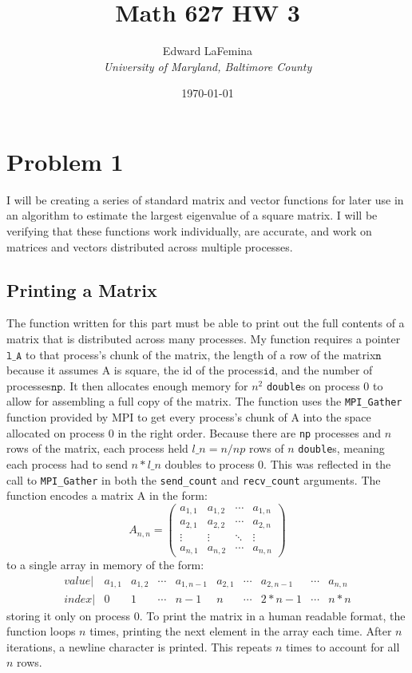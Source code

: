 \documentclass[11pt]{article}
\author{Edward LaFemina \\
		\it{University of Maryland, Baltimore County}}
\title{Math 627 HW 3}
\date{\today}
\begin{document}
\maketitle
\tableofcontents

\pagebreak
\section{Problem 1}
I will be creating a series of standard matrix and vector functions for later use in an algorithm to estimate the largest eigenvalue of a square matrix. I will be verifying that these functions work individually, are accurate, and work on matrices and vectors distributed across multiple processes.

\subsection{Printing a Matrix}
The function written for this part must be able to print out the full contents of a matrix that is distributed across many processes. My function requires a pointer\(\texttt{l\_A}\) to that process's chunk of the matrix, the length of a row of the matrix\(\texttt{n}\) because it assumes A is square, the id of the process\(\texttt{id}\), and the number of processes\(\texttt{np}\). It then allocates enough memory for $ n^2 $ \texttt{double}s on process $ 0 $ to allow for assembling a full copy of the matrix. The function uses the \texttt{MPI\_Gather} function provided by MPI to get every process's chunk of A into the space allocated on process 0 in the right order. Because there are \texttt{np} processes and $ n $ rows of the matrix, each process held $ l\_n = n / np $ rows of $ n $ \texttt{double}s, meaning each process had to send $ n*l\_n $ doubles to process $ 0 $. This was reflected in the call to \texttt{MPI\_Gather} in both the \texttt{send\_count} and \texttt{recv\_count} arguments. The function encodes a matrix A in the form:
$$
A_{n,n} =
\begin{pmatrix}
	a_{1,1} & a_{1,2} & \cdots & a_{1,n} \\
	a_{2,1} & a_{2,2} & \cdots & a_{2,n} \\
	\vdots  & \vdots  & \ddots & \vdots  \\
	a_{n,1} & a_{n,2} & \cdots & a_{n,n} 
\end{pmatrix}
$$
 to a single array in memory of the form:
$$
\begin{matrix} 
value |& a_{1,1} & a_{1,2} & \cdots & a_{1,n-1} & a_{2,1} & \cdots & a_{2,n-1} & \cdots & a_{n,n} \\
index |& 0       & 1       & \cdots & n-1       & n       & \cdots & 2*n - 1   & \cdots & n*n
\end{matrix}
$$
storing it only on process $ 0 $. To print the matrix in a human readable format, the function loops $ n $ times, printing the next element in the array each time. After $ n $ iterations, a newline character is printed. This repeats $ n $ times to account for all $ n $ rows.
\end{document}
